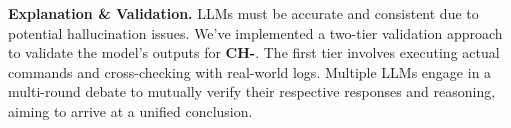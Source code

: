 \noindent
{\bf Explanation \& Validation.} LLMs must be accurate and consistent due to potential hallucination issues. We've implemented a two-tier validation approach to validate the model's outputs for {\bf CH-}. The first tier involves executing actual commands and cross-checking with real-world logs. Multiple LLMs engage in a multi-round debate to mutually verify their respective responses and reasoning, aiming to arrive at a unified conclusion. 







